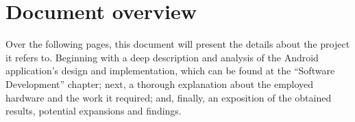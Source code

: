	\section{Document overview}
		Over the following pages, this document will present the details about the project it refers to.
		Beginning with a deep description and analysis of the Android application's design and implementation,
		which can be found at the ``Software Development'' chapter; next, a thorough explanation about the
		employed hardware and the work it required; and, finally, an exposition of the obtained results,
		potential expansions and findings.  

		



		

		
		
		
